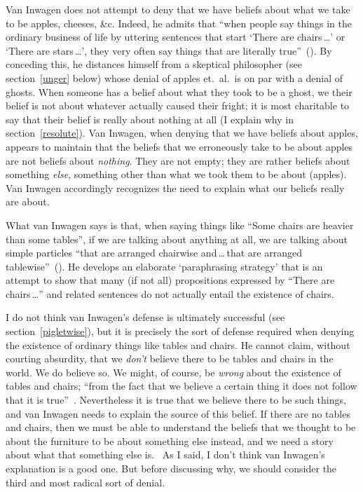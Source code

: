 \documentclass[11pt]{article}
\begin{document}
\begin{spacing}{1.5}
Van Inwagen does not attempt to deny that we have beliefs about what we take to be apples, cheeses, \&c. Indeed, he admits that ``when people say things in the ordinary business of life by uttering sentences that start `There are chairs\,\ldots ' or `There are stars\,\ldots ', they very often say things that are literally true''~(\citeyear[102]{inwagen1995}). By conceding this, he distances himself from a skeptical philosopher (see section~\ref{unger} below) whose denial of apples et.\ al.\ is on par with a denial of ghosts. When someone has a belief about what they took to be a ghost, we their belief is not about whatever actually caused their fright; it is most charitable to say that their belief is really about nothing at all (I explain why in section~\ref{resolute}). Van Inwagen, when denying that we have beliefs about apples, appears to maintain that the beliefs that we erroneously take to be about apples are not beliefs about {\em nothing}. They are not empty; they are rather beliefs about something {\em else}, something other than what we took them to be about (apples). Van Inwagen accordingly recognizes the need to explain what our beliefs really are about.

What van Inwagen says is that, when saying things like ``Some chairs are heavier than some tables'', if we are talking about anything at all, we are talking about simple particles ``that are arranged chairwise and\,\ldots\,that are arranged tablewise''~(\citeyear[109]{inwagen1995}). He develops an elaborate `paraphrasing strategy' that is an attempt to show that many (if not all) propositions expressed by ``There are chairs\,\ldots '' and related sentences do not actually entail the existence of chairs.

I do not think van Inwagen's defense is ultimately successful (see section~\ref{pigletwise}), but it is precisely the sort of defense required when denying the existence of ordinary things like tables and chairs. He cannot claim, without courting absurdity, that we {\em don't} believe there to be tables and chairs in the world. We do believe so. We might, of course, be {\em wrong} about the existence of tables and chairs; ``from the fact that we believe a certain thing it does not follow that it is true''~\citep[21]{stroud2000a}. Nevertheless it is true that we believe there to be such things, and van Inwagen needs to explain the source of this belief. If there are no tables and chairs, then we must be able to understand the beliefs that we thought to be about the furniture to be about something else instead, and we need a story about what that something else is.
\ As I said, I don't think van Inwagen's explanation is a good one. But before discussing why, we should consider the third and most radical sort of denial.


\end{spacing}
\end{document}
